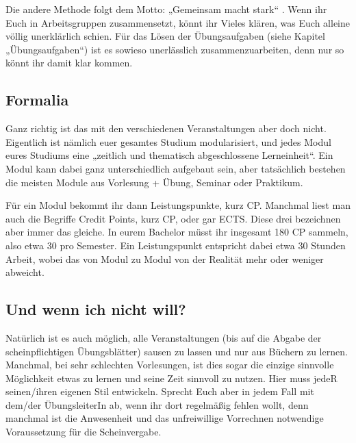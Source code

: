 Die andere Methode folgt dem Motto: „Gemeinsam macht stark“ . Wenn ihr Euch in Arbeitsgruppen zusammensetzt, könnt ihr Vieles klären, was Euch alleine völlig unerklärlich schien. Für das Lösen der Übungsaufgaben (siehe Kapitel „Übungsaufgaben“) ist es sowieso unerlässlich zusammenzuarbeiten, denn nur so könnt ihr damit klar kommen.

\subsection{Formalia}

Ganz richtig ist das mit den verschiedenen Veranstaltungen aber doch nicht. Eigentlich ist nämlich euer gesamtes Studium modularisiert, und jedes Modul eures Studiums eine „zeitlich und thematisch abgeschlossene Lerneinheit“. Ein Modul kann dabei ganz unterschiedlich aufgebaut sein, aber tatsächlich bestehen die meisten Module aus Vorlesung + Übung, Seminar oder Praktikum.

Für ein Modul bekommt ihr dann Leistungspunkte, kurz \gls{CP}. Manchmal liest man auch die Begriffe Credit Points, kurz \gls{CP}, oder gar \gls{ECTS}. Diese drei bezeichnen aber immer das gleiche. In eurem Bachelor müsst ihr insgesamt 180 \gls{CP} sammeln, also etwa 30 pro Semester. Ein Leistungspunkt entspricht dabei etwa 30 Stunden Arbeit, wobei das von Modul zu Modul von der Realität mehr oder weniger abweicht.

\subsection{Und wenn ich nicht will?}

Natürlich ist es auch möglich, alle Veranstaltungen (bis auf die Abgabe der scheinpflichtigen Übungsblätter) sausen zu lassen und nur aus Büchern zu lernen. Manchmal, bei sehr schlechten Vorlesungen, ist dies sogar die einzige sinnvolle Möglichkeit etwas zu lernen und seine Zeit sinnvoll zu nutzen. Hier muss jedeR seinen/ihren eigenen Stil entwickeln. Sprecht Euch aber in jedem Fall mit dem/der ÜbungsleiterIn ab, wenn ihr dort regelmäßig fehlen wollt, denn manchmal ist die Anwesenheit und das unfreiwillige Vorrechnen notwendige Voraussetzung für die Scheinvergabe.
